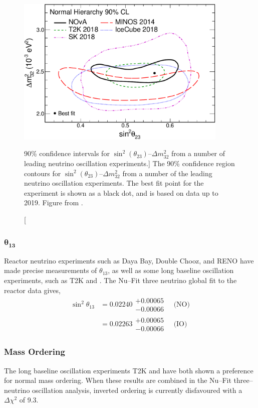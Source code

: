 \begin{figure}
	\centering
	\includegraphics[width=0.9\textwidth]{figures/theta23_msquare.pdf}
	\caption 
	[90\% confidence intervals for $\sin^2 (\theta_{23})$--$\Delta m^2_{32}$ from
	a number of leading neutrino oscillation experiments.]
	{The 90\% confidence region contours for 
	$\sin^2 (\theta_{23})$--$\Delta m^2_{32}$ from a number of the leading 
	neutrino oscillation experiments\cite{PhysRevD.96.092006, PhysRevLett.112.191801, PhysRevLett.123.151803}. 
	The best fit point for the \nova{} experiment is shown as a black dot, and is
	based on data up to 2019. Figure from \cite{PhysRevLett.123.151803}.}
	\label{fig:delm_sin23}
\end{figure}

\subsubsection*{$\boldsymbol{\theta_{13}}$}
Reactor neutrino experiments such as Daya Bay\cite{An:2012eh}, Double 
Chooz\cite{Abe:2013sxa}, and RENO\cite{Ahn:2012nd} have made precise
measurements of $\theta_{13}$, as well as some long baseline oscillation 
experiments, such as T2K and \nova{}. The Nu--Fit three neutrino global fit to 
the reactor data gives,
\begin{align*}
	\sin^2 \theta_{13} &= 0.02240 \substack{+ 0.00065 \\ - 0.00066} \quad \mbox{(NO)} \\ 
	                   &= 0.02263 \substack{+ 0.00065 \\ - 0.00066} \quad \mbox{(IO)}  
\end{align*}

\subsubsection*{Mass Ordering}
The long baseline oscillation experiments T2K and \nova{} have both shown a
preference for normal mass 
ordering\cite{PhysRevD.96.092006,PhysRevLett.123.151803}. When these results are
combined in the Nu--Fit three--neutrino oscillation analysis, inverted 
ordering is currently disfavoured with a $\Delta \chi^2$ of 9.3.

